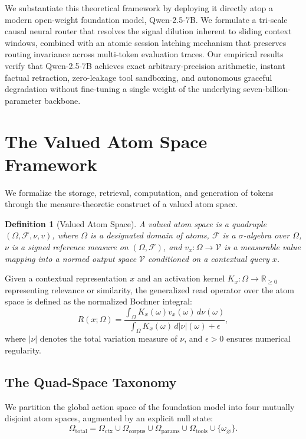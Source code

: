 \documentclass[preprint,12pt]{elsarticle}
\newtheorem{definition}{Definition}
\begin{document}
We substantiate this theoretical framework by deploying it directly atop a modern open-weight foundation model, Qwen-2.5-7B. We formulate a tri-scale causal neural router that resolves the signal dilution inherent to sliding context windows, combined with an atomic session latching mechanism that preserves routing invariance across multi-token evaluation traces. Our empirical results verify that Qwen-2.5-7B achieves exact arbitrary-precision arithmetic, instant factual retraction, zero-leakage tool sandboxing, and autonomous graceful degradation without fine-tuning a single weight of the underlying seven-billion-parameter backbone.

\section{The Valued Atom Space Framework}

We formalize the storage, retrieval, computation, and generation of tokens through the measure-theoretic construct of a valued atom space.

\begin{definition}[Valued Atom Space]
A valued atom space is a quadruple $(\Omega, \mathcal{F}, \nu, v)$, where $\Omega$ is a designated domain of atoms, $\mathcal{F}$ is a $\sigma$-algebra over $\Omega$, $\nu$ is a signed reference measure on $(\Omega, \mathcal{F})$, and $v_x: \Omega \to \mathcal{V}$ is a measurable value mapping into a normed output space $\mathcal{V}$ conditioned on a contextual query $x$.
\end{definition}

Given a contextual representation $x$ and an activation kernel $K_x: \Omega \to \mathbb{R}_{\ge 0}$ representing relevance or similarity, the generalized read operator over the atom space is defined as the normalized Bochner integral:
\begin{equation}
R(x; \Omega) = \frac{\int_\Omega K_x(\omega) v_x(\omega) \, d\nu(\omega)}{\int_\Omega K_x(\omega) \, d|\nu|(\omega) + \epsilon},
\label{eq:bochner_read}
\end{equation}
where $|\nu|$ denotes the total variation measure of $\nu$, and $\epsilon > 0$ ensures numerical regularity.

\subsection{The Quad-Space Taxonomy}

We partition the global action space of the foundation model into four mutually disjoint atom spaces, augmented by an explicit null state:
\begin{equation}
\Omega_{\mathrm{total}} = \Omega_{\mathrm{ctx}} \cup \Omega_{\mathrm{corpus}} \cup \Omega_{\mathrm{params}} \cup \Omega_{\mathrm{tools}} \cup \{\omega_\varnothing\}.
\end{equation}
\end{document}
